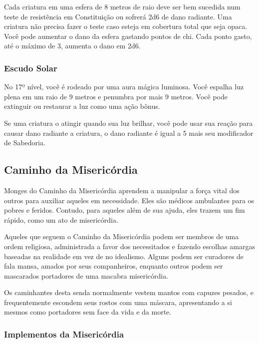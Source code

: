 \begin{multicols}{2}
Cada criatura em uma esfera de 8 metros de raio deve ser bem sucedida num teste
de resistência em Constituição ou sofrerá 2d6 de dano radiante. Uma criatura não
precisa fazer o teste caso esteja em cobertura total que seja opaca. Você pode
aumentar o dano da esfera gastando pontos de chi. Cada ponto gasto, até o máximo
de 3, aumenta o dano em 2d6.

\subsubsection*{Escudo Solar}%
\label{ssub:escudo_solar}

No 17º nível, você é rodeado por uma aura mágica luminosa. Você espalha luz
plena em um raio de 9 metros e penumbra por mais 9 metros. Você pode extinguir
ou restaurar a luz como uma ação bônus.

Se uma criatura o atingir quando sua luz brilhar, você pode usar sua reação para
causar dano radiante a criatura, o dano radiante é igual a 5 mais seu
modificador de Sabedoria.

\subsection*{Caminho da Misericórdia}%
\label{sub:caminho_da_misericordia}

Monges do Caminho da Misericórdia aprendem a manipular a força vital dos outros
para auxiliar aqueles em necessidade. Eles são médicos ambulantes para os pobres
e feridos. Contudo, para aqueles além de sua ajuda, eles trazem um fim rápido,
como um ato de misericórdia.

Aqueles que seguem o Caminho da Misericórdia podem ser membros de uma ordem
religiosa, administrada a favor dos necessitados e fazendo escolhas amargas
baseadas na realidade em vez de no idealismo. Alguns podem ser curadores de fala
mansa, amados por seus companheiros, enquanto outros podem ser mascarados
portadores de uma macabra misericórdia.

Os caminhantes desta senda normalmente vestem mantos com capuzes pesados, e
frequentemente escondem seus rostos com uma máscara, apresentando a si mesmos
como portadores sem face da vida e da morte.

\subsubsection*{Implementos da Misericórdia}%
\label{ssub:implementos_da_misericordia}


\end{multicols}
